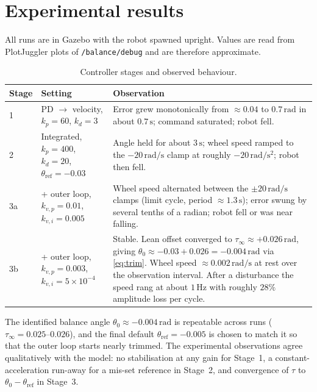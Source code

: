 \documentclass[11pt,a4paper]{article}
\newcommand{\rads}{\,\mathrm{rad/s}}
\newcommand{\radss}{\,\mathrm{rad/s^2}}
\begin{document}
\section{Experimental results}
\label{sec:results}
All runs are in Gazebo with the robot spawned upright. Values are read from
PlotJuggler plots of \texttt{/balance/debug} and are therefore approximate.

\begin{table}[ht]
\centering
\caption{Controller stages and observed behaviour.}
\small
\begin{tabular}{@{}p{1.6cm}p{4.3cm}p{7.3cm}@{}}
\toprule
Stage & Setting & Observation \\
\midrule
1 & PD $\to$ velocity, $k_p{=}60$, $k_d{=}3$ &
  Error grew monotonically from $\approx0.04$ to $0.7\,\mathrm{rad}$ in about
  $0.7\,\mathrm{s}$; command saturated; robot fell. \\
2 & Integrated, $k_p{=}400$, $k_d{=}20$, $\theta_\mathrm{ref}{=}-0.03$ &
  Angle held for about $3\,\mathrm{s}$; wheel speed ramped to the
  $-20\rads$ clamp at roughly $-20\radss$; robot then fell. \\
3a & + outer loop, $k_{v,p}{=}0.01$, $k_{v,i}{=}0.005$ &
  Wheel speed alternated between the $\pm20\rads$ clamps (limit cycle,
  period $\approx1.3\,\mathrm{s}$); error swung by several tenths of a
  radian; robot fell or was near falling. \\
3b & + outer loop, $k_{v,p}{=}0.003$, $k_{v,i}{=}5{\times}10^{-4}$ &
  Stable. Lean offset converged to $\tau_\infty\approx+0.026\,\mathrm{rad}$,
  giving $\theta_0 \approx -0.03+0.026 = -0.004\,\mathrm{rad}$
  via \eqref{eq:trim}. Wheel speed $\approx 0.002\rads$ at rest over the
  observation interval. After a disturbance the speed rang at about
  $1\,\mathrm{Hz}$ with roughly $28\%$ amplitude loss per cycle. \\
\bottomrule
\end{tabular}
\end{table}

The identified balance angle $\theta_0\approx-0.004\,\mathrm{rad}$ is
repeatable across runs ($\tau_\infty = 0.025$--$0.026$), and the final
default $\theta_\mathrm{ref}=-0.005$ is chosen to match it so that the outer
loop starts nearly trimmed. The experimental observations agree
qualitatively with the model: no stabilisation at any gain for Stage~1,
a constant-acceleration run-away for a mis-set reference in Stage~2, and
convergence of $\tau$ to $\theta_0-\theta_\mathrm{ref}$ in Stage~3.
\end{document}
